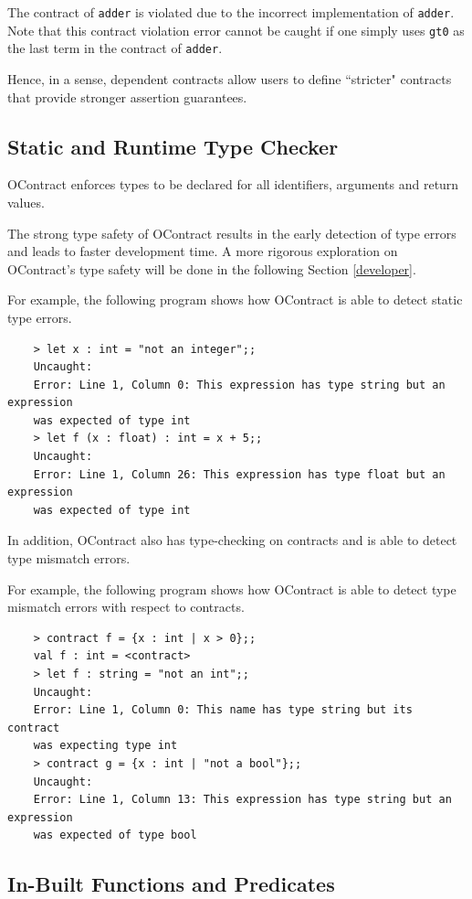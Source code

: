 \documentclass[a4paper]{article}
\begin{document}
The contract of \texttt{adder} is violated due to the incorrect implementation of \texttt{adder}.
Note that this contract violation error cannot be caught if one simply uses \texttt{gt0} as the last term in the contract of \texttt{adder}.

Hence, in a sense, dependent contracts allow users to define ``stricter" contracts that provide stronger assertion guarantees.

\subsection{Static and Runtime Type Checker}

OContract enforces types to be declared for all identifiers, arguments and return values.

The strong type safety of OContract results in the early detection of type errors and leads to faster development time.
A more rigorous exploration on OContract's type safety will be done in the following Section \ref{developer}.

For example, the following program shows how OContract is able to detect static type errors.

\begin{verbatim}
    > let x : int = "not an integer";;
    Uncaught:
    Error: Line 1, Column 0: This expression has type string but an expression
    was expected of type int
    > let f (x : float) : int = x + 5;;
    Uncaught:
    Error: Line 1, Column 26: This expression has type float but an expression
    was expected of type int
\end{verbatim}

In addition, OContract also has type-checking on contracts and is able to detect type mismatch errors.

For example, the following program shows how OContract is able to detect type mismatch errors with respect to contracts.

\begin{verbatim}
    > contract f = {x : int | x > 0};;
    val f : int = <contract>
    > let f : string = "not an int";;
    Uncaught:
    Error: Line 1, Column 0: This name has type string but its contract
    was expecting type int
    > contract g = {x : int | "not a bool"};;
    Uncaught:
    Error: Line 1, Column 13: This expression has type string but an expression
    was expected of type bool
\end{verbatim}

\subsection{In-Built Functions and Predicates}
\end{document}
